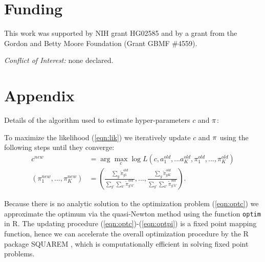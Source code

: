 \documentclass{bioinfo}
\begin{document}
\section*{Funding}
This work was supported by NIH grant HG02585 and 
by a grant from the Gordon and Betty Moore Foundation (Grant GBMF \#4559).

\noindent \emph{Conflict of Interest:} none declared.







 
\nocite{*}

\section*{Appendix}
Details of the algorithm used to estimate hyper-parameters $c$ and $\mathbf \pi$: 

To maximize the likelihood (\ref{eqn:lik})
we iteratively update $c$ and $\mathbf \pi$ using the following steps until they converge:
\begin{align}
c^{new}&=\arg\max_{c} \log L(c,a_1^{old},...a_K^{old},\pi_1^{old},...,\pi_K^{old}) \label{eqn:optc} \\
(\pi_1^{new},...,\pi_K^{new})&=\left(\frac{\sum_g \tilde{\pi}_{g1}^{old}}{\sum_{g'}\sum_{k'} \tilde{\pi}_{g'k'}^{old}},...,\frac{\sum_g \tilde{\pi}_{gK}^{old}}{\sum_{g'}\sum_{k'} \tilde{\pi}_{g'k'}^{old}}\right). \label{eqn:optpi}
\end{align}

Because there is no analytic solution to the optimization problem (\ref{eqn:optc}) we approximate the optimum via the quasi-Newton method
using the function {\tt optim} in R. The updating procedure (\ref{eqn:optc})-(\ref{eqn:optpi}) is a fixed point mapping function, hence we can accelerate the overall optimization procedure by the R package SQUAREM \citep{varadhan2010squarem}, which is computationally efficient in solving fixed point problems. 
\end{document}
